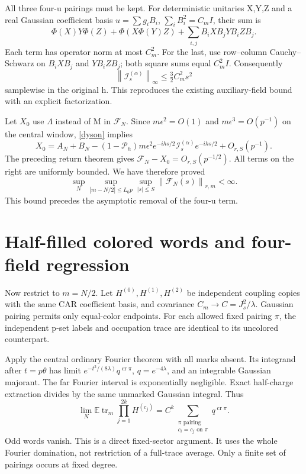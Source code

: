 \documentclass[11pt]{article}
\newcommand{\E}{\mathbb E}
\newcommand{\tr}{\operatorname{tr}}
\newcommand{\Pin}{\mathcal P_h}
\newcommand{\norm}[1]{\left\lVert#1\right\rVert}
\begin{document}
All three four-u pairings must be kept. For deterministic unitaries
X,Y,Z and a real Gaussian coefficient basis $u=\sum g_iB_i$,
$\sum_iB_i^2=C_mI$, their sum is
\[
 \Phi(X)Y\Phi(Z)+\Phi(X\Phi(Y)Z)
       +\sum_{i,j}B_iXB_jYB_iZB_j.
\]
Each term has operator norm at most $C_m^2$. For the last, use
row--column Cauchy--Schwarz on $B_iXB_j$ and $YB_iZB_j$;
both square sums equal $C_m^2I$. Consequently
\begin{equation}\label{Ibound}
 \norm{\mathcal I_s^{(\alpha)}}_\infty\le\tfrac32 C_m^2s^2
\end{equation}
samplewise in the original h. This reproduces the existing
auxiliary-field bound \cite{uniform,two} with an explicit factorization.

Let $X_0$ use $\Lambda$ instead of M in $\mathcal F_N$.
Since $m\epsilon^2=O(1)$ and $m\epsilon^3=O(p^{-1})$ on the
central window, \eqref{dyson} implies
\[
 X_0=A_N+B_N-(1-\Pin)m\epsilon^2e^{-ihs/2}
                \mathcal I_s^{(\alpha)}e^{-ihs/2}+O_{r,S}(p^{-1}).
\]
The preceding return theorem \cite{return} gives
$\mathcal F_N-X_0=O_{r,S}(p^{-1/2})$. All terms on the right are
uniformly bounded. We have therefore proved
\begin{equation}\label{memory-bound}
 \sup_N\sup_{|m-N/2|\le L_0p}\sup_{|s|\le S}
             \norm{\mathcal F_N(s)}_{r,m}<\infty.
\end{equation}
This bound precedes the asymptotic removal of the four-u term.

\newpage
\section{Half-filled colored words and four-field regression}
Now restrict to $m=N/2$. Let $H^{(0)},H^{(1)},H^{(2)}$ be
independent coupling copies with the same CAR coefficient basis,
and covariance $C_m\to C=J_s^2/\lambda$. Gaussian pairing permits
only equal-color endpoints. For each allowed fixed pairing
$\pi$, the independent p-set labels and occupation trace are
identical to its uncolored counterpart.

Apply the central ordinary Fourier theorem \cite{central} with
all marks absent. Its integrand after $t=p\theta$ has limit
$e^{-t^2/(8\lambda)}q^{\operatorname{cr}\pi}$,
$q=e^{-4\lambda}$, and an integrable Gaussian majorant.
The far Fourier interval is exponentially negligible. Exact
half-charge extraction divides by the same unmarked Gaussian
integral. Thus
\begin{equation}\label{colored}
 \lim_N\E\tr_m\prod_{j=1}^{2k}H^{(c_j)}
 =C^k\sum_{\substack{\pi\text{ pairing}\\c_i=c_j\text{ on }\pi}}
                  q^{\operatorname{cr}\pi}.
\end{equation}
Odd words vanish. This is a direct fixed-sector argument. It
uses the whole Fourier domination, not restriction of a full-trace
average. Only a finite set of pairings occurs at fixed degree.
\end{document}
